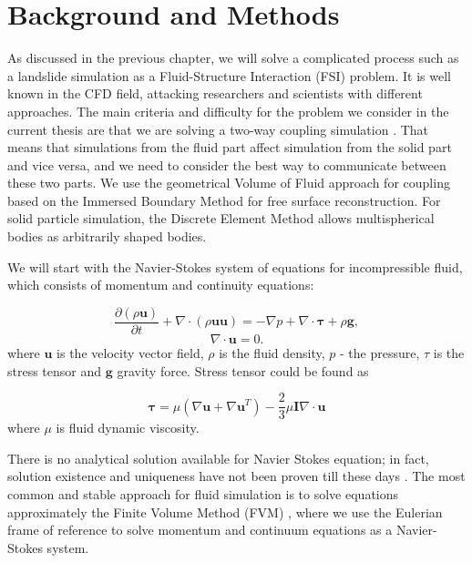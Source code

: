 \chapter{Background and Methods} \label{chap:theory}

As discussed in the previous chapter, we will solve a complicated process such as a landslide simulation as a Fluid-Structure Interaction (FSI) problem. It is well known in the CFD field, attacking researchers and scientists with different approaches. The main criteria and difficulty for the problem we consider in the current thesis are that we are solving a two-way coupling simulation \cite{benra2011comparison}. That means that simulations from the fluid part affect simulation from the solid part and vice versa, and we need to consider the best way to communicate between these two parts. We use the geometrical Volume of Fluid approach for coupling based on the Immersed Boundary Method for free surface reconstruction. For solid particle simulation, the Discrete Element Method allows multispherical bodies as arbitrarily shaped bodies.

We will start with the Navier-Stokes system of equations for incompressible fluid, which consists of momentum and continuity equations:

\begin{equation}\label{NS_methods}
\frac{\partial(\rho \mathbf{u})}{\partial t}+\nabla \cdot(\rho \mathbf{u u})=-\nabla p+\nabla \cdot \boldsymbol{\tau}+\rho \mathbf{g},
\end{equation}
\begin{equation}
\nabla \cdot \mathbf{u}=0.
\end{equation}
where $\mathbf{u}$ is the velocity vector field, $\rho$ is the fluid density, $p$ - the pressure, $\tau$ is the stress tensor and $\mathbf{g}$ gravity force. Stress tensor could be found as

\begin{equation}
\boldsymbol{\tau}=\mu\left(\nabla \boldsymbol{u}+\nabla \boldsymbol{u}^T\right)-\frac{2}{3} \mu \boldsymbol{I} \nabla \cdot \boldsymbol{u}
\end{equation}
where $\mu$ is fluid dynamic viscosity.

There is no analytical solution available for Navier Stokes equation; in fact, solution existence and uniqueness have not been proven till these days \cite{klay}. The most common and stable approach for fluid simulation is to solve equations approximately the Finite Volume Method (FVM) \cite{ferziger2002cfd}, where we use the Eulerian frame of reference to solve momentum and continuum equations as a Navier-Stokes system.

